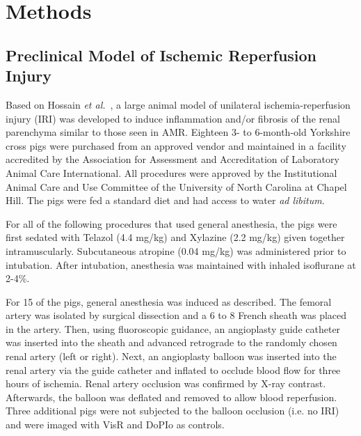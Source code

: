 \section{Methods}

\subsection{Preclinical Model of Ischemic Reperfusion Injury}

Based on Hossain \emph{et al.}~\cite{hossain_Mechanical_2019}, a large animal model of unilateral ischemia-reperfusion injury (IRI) was developed to induce inflammation and/or fibrosis of the renal parenchyma similar to those seen in AMR. Eighteen 3- to 6-month-old Yorkshire cross pigs were purchased from an approved vendor and maintained in a facility accredited by the Association for Assessment and Accreditation of Laboratory Animal Care International. All procedures were approved by the Institutional Animal Care and Use Committee of the University of North Carolina at Chapel Hill. The pigs were fed a standard diet and had access to water \emph{ad libitum}.

For all of the following procedures that used general anesthesia, the pigs were first sedated with Telazol (4.4 mg/kg) and Xylazine (2.2 mg/kg) given together intramuscularly. Subcutaneous atropine (0.04 mg/kg) was administered prior to intubation.  After intubation, anesthesia was maintained with inhaled isoflurane at 2-4\%.

For 15 of the pigs, general anesthesia was induced as described. The femoral artery was isolated by surgical dissection and a 6 to 8 French sheath was placed in the artery. Then, using fluoroscopic guidance, an angioplasty guide catheter was inserted into the sheath and advanced retrograde to the randomly chosen renal artery (left or right). Next, an angioplasty balloon was inserted into the renal artery via the guide catheter and inflated to occlude blood flow for three hours of ischemia. Renal artery occlusion was confirmed by X-ray contrast. Afterwards, the balloon was deflated and removed to allow blood reperfusion. Three additional pigs were not subjected to the balloon occlusion (i.e. no IRI) and were imaged with VisR and DoPIo as controls.

